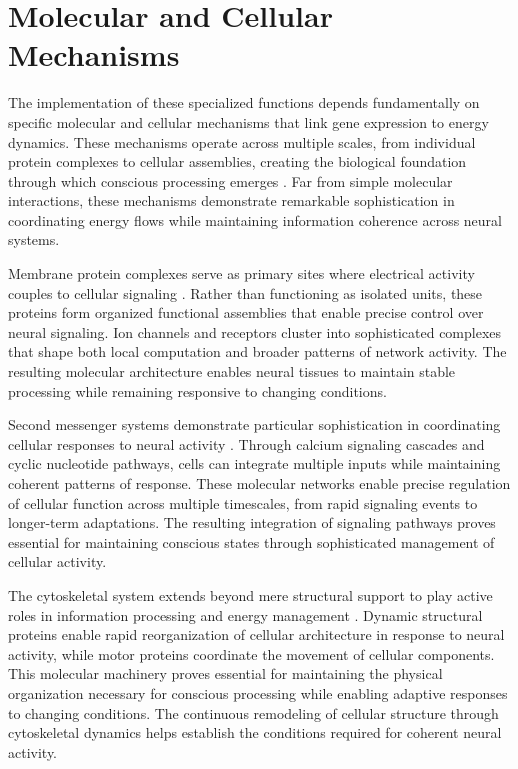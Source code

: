 \section{Molecular and Cellular Mechanisms}

The implementation of these specialized functions depends fundamentally on specific molecular and cellular mechanisms that link gene expression to energy dynamics. These mechanisms operate across multiple scales, from individual protein complexes to cellular assemblies, creating the biological foundation through which conscious processing emerges \cite{Baluska2016}. Far from simple molecular interactions, these mechanisms demonstrate remarkable sophistication in coordinating energy flows while maintaining information coherence across neural systems.

Membrane protein complexes serve as primary sites where electrical activity couples to cellular signaling \cite{Barker2018}. Rather than functioning as isolated units, these proteins form organized functional assemblies that enable precise control over neural signaling. Ion channels and receptors cluster into sophisticated complexes that shape both local computation and broader patterns of network activity. The resulting molecular architecture enables neural tissues to maintain stable processing while remaining responsive to changing conditions.

Second messenger systems demonstrate particular sophistication in coordinating cellular responses to neural activity \cite{Bashir2019}. Through calcium signaling cascades and cyclic nucleotide pathways, cells can integrate multiple inputs while maintaining coherent patterns of response. These molecular networks enable precise regulation of cellular function across multiple timescales, from rapid signaling events to longer-term adaptations. The resulting integration of signaling pathways proves essential for maintaining conscious states through sophisticated management of cellular activity.

The cytoskeletal system extends beyond mere structural support to play active roles in information processing and energy management \cite{Devor2016}. Dynamic structural proteins enable rapid reorganization of cellular architecture in response to neural activity, while motor proteins coordinate the movement of cellular components. This molecular machinery proves essential for maintaining the physical organization necessary for conscious processing while enabling adaptive responses to changing conditions. The continuous remodeling of cellular structure through cytoskeletal dynamics helps establish the conditions required for coherent neural activity.

